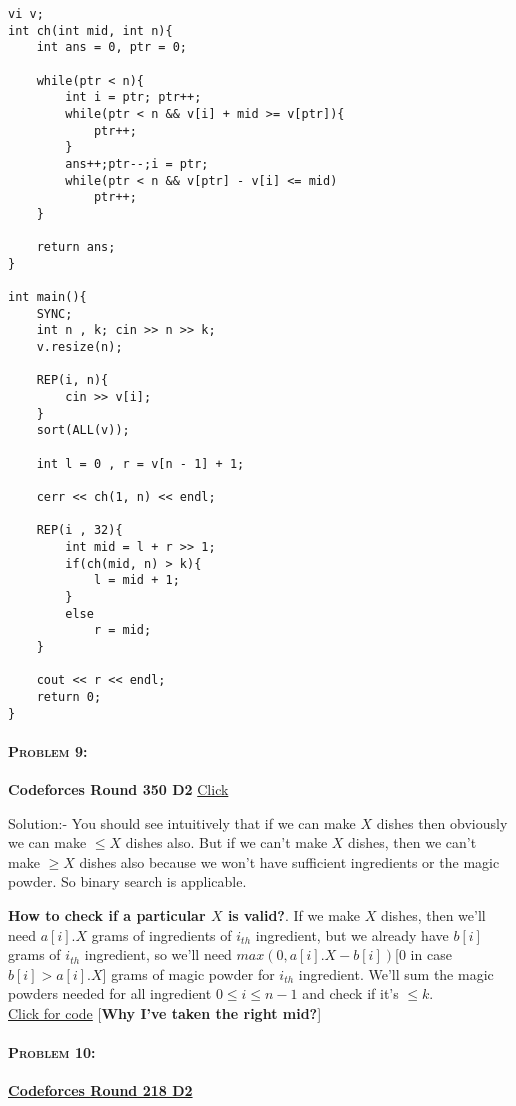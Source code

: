 \documentclass[12pt]{article}
\begin{document}
\begin{large}
\begin{verbatim}
vi v;
int ch(int mid, int n){
	int ans = 0, ptr = 0; 

	while(ptr < n){
		int i = ptr; ptr++;  
		while(ptr < n && v[i] + mid >= v[ptr]){
			ptr++; 
		}
		ans++;ptr--;i = ptr; 
		while(ptr < n && v[ptr] - v[i] <= mid)
			ptr++; 
	}

	return ans; 
}

int main(){
	SYNC; 
	int n , k; cin >> n >> k; 
	v.resize(n); 

	REP(i, n){
		cin >> v[i]; 
	}
	sort(ALL(v)); 

	int l = 0 , r = v[n - 1] + 1;

	cerr << ch(1, n) << endl; 

	REP(i , 32){
		int mid = l + r >> 1; 
		if(ch(mid, n) > k){
			l = mid + 1; 
		}
		else 
			r = mid; 
	}

	cout << r << endl; 
	return 0; 
}
\end{verbatim}

\paragraph{\large \textsc{Problem 9:}}\textbf{Codeforces Round 350 D2} \href{http://codeforces.com/contest/670/problem/D1}{Click}

Solution:- You should see intuitively that if we can make $X$ dishes then obviously we can make $ \leq X$ dishes also. But if we can't make $X$ dishes, then we can't make $\geq X$ dishes also because we won't have sufficient ingredients or the magic powder. So binary search is applicable.

\textbf{How to check if a particular $X$ is valid?}. If we make $X$ dishes, then we'll need $a[i].X$ grams of ingredients of $i_{th}$ ingredient, but we already have $b[i]$ grams of $i_{th}$ ingredient, so we'll need $max(0, a[i].X - b[i])$[$0$ in case $b[i] > a[i].X$] grams of magic powder for $i_{th}$ ingredient. We'll sum the magic powders needed for all ingredient $0 \leq i \leq n - 1$ and check if it's $\leq k$.\\ 
\href{http://codeforces.com/contest/670/submission/25956342}{Click for code} [\textbf{Why I've taken the right mid?}]\\

\paragraph{\large \textsc{Problem 10:}} \href{http://codeforces.com/contest/371/problem/C}{\textbf{Codeforces Round 218 D2} }


\end{large}
\end{document}

